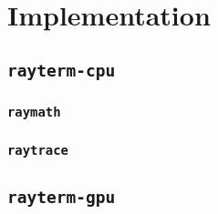 %
%
%
\chapter{Implementation}\label{ch:implementation}

\section{\texttt{rayterm-cpu}}\label{ch:implementation:rayterm-cpu}

\subsection{\texttt{raymath}}\label{ch:implementation:rayterm-cpu:raymath}

\subsection{\texttt{raytrace}}\label{ch:implementation:rayterm-cpu:raytrace}


\section{\texttt{rayterm-gpu}}\label{ch:implementation:rayterm-cpu}
